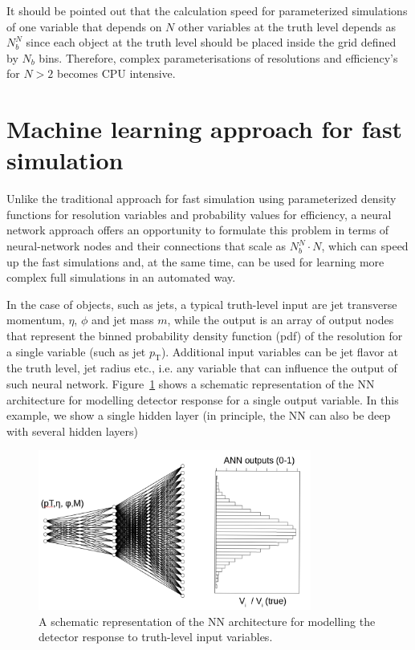 \documentclass[showpacs,showkeys,preprint,prd,nofootinbib,linenumbers,12pt]{revtex4-1}
\def\pt{\ensuremath{p_{\mathrm{T}}}}
\begin{document}
It should be pointed out that the calculation speed for parameterized simulations of one variable that depends on $N$ other variables at the truth level depends  as $N_b^N$ since each object at the truth level should be placed inside the grid defined by $N_b$ bins. Therefore, complex parameterisations of resolutions and efficiency's for $N>2$ becomes CPU intensive. 

\section{Machine learning approach for fast simulation}

Unlike the traditional approach for fast simulation using parameterized density functions for resolution variables and probability values for efficiency, a neural network approach offers an opportunity to formulate this problem in terms of neural-network nodes and their connections that scale as $N_b^N \cdot N$, which can speed up the fast simulations and, at the same time, can be used for learning more complex full simulations in an automated way.

In the case of objects, such as jets, a typical truth-level input are jet transverse momentum, $\eta$, $\phi$ and jet mass $m$, while the output
is an array of output nodes that represent the binned probability density function (pdf) of the resolution for a single variable (such as jet \pt). Additional input variables can be jet flavor at the truth level, jet radius etc., i.e. any variable that 
can influence the output of such neural network. Figure~\ref{ann_example} shows a schematic representation of the NN architecture for modelling detector response for a single output variable. In this example, we show a single hidden layer (in principle, the NN can also be deep with several hidden layers)

\begin{figure}[h]
  \includegraphics[width=0.8\textwidth]{nn_example.png}
  \caption{A schematic representation of the NN architecture for modelling the detector response to truth-level input variables.}
  \label{ann_example}
\end{figure}
\end{document}
